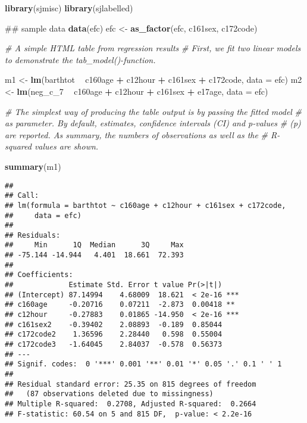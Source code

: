 \documentclass[]{article}
\newenvironment{Shaded}{\begin{snugshade}}{\end{snugshade}}
\newcommand{\KeywordTok}[1]{\textcolor[rgb]{0.13,0.29,0.53}{\textbf{#1}}}
\newcommand{\DataTypeTok}[1]{\textcolor[rgb]{0.13,0.29,0.53}{#1}}
\newcommand{\DecValTok}[1]{\textcolor[rgb]{0.00,0.00,0.81}{#1}}
\newcommand{\StringTok}[1]{\textcolor[rgb]{0.31,0.60,0.02}{#1}}
\newcommand{\CommentTok}[1]{\textcolor[rgb]{0.56,0.35,0.01}{\textit{#1}}}
\newcommand{\OperatorTok}[1]{\textcolor[rgb]{0.81,0.36,0.00}{\textbf{#1}}}
\newcommand{\NormalTok}[1]{#1}
\begin{document}
\begin{Shaded}
\begin{Highlighting}[]
\KeywordTok{library}\NormalTok{(sjmisc)}
\KeywordTok{library}\NormalTok{(sjlabelled)}

\NormalTok{## sample data}
\KeywordTok{data}\NormalTok{(efc)}
\NormalTok{efc <-}\StringTok{ }\KeywordTok{as_factor}\NormalTok{(efc, c161sex, c172code)}

\CommentTok{# A simple HTML table from regression results}
\CommentTok{# First, we fit two linear models to demonstrate the tab_model()-function.}
 
\NormalTok{m1 <-}\StringTok{ }\KeywordTok{lm}\NormalTok{(barthtot }\OperatorTok{~}\StringTok{ }\NormalTok{c160age }\OperatorTok{+}\StringTok{ }\NormalTok{c12hour }\OperatorTok{+}\StringTok{ }\NormalTok{c161sex }\OperatorTok{+}\StringTok{ }\NormalTok{c172code, }\DataTypeTok{data =}\NormalTok{ efc)}
\NormalTok{m2 <-}\StringTok{ }\KeywordTok{lm}\NormalTok{(neg_c_}\DecValTok{7} \OperatorTok{~}\StringTok{ }\NormalTok{c160age }\OperatorTok{+}\StringTok{ }\NormalTok{c12hour }\OperatorTok{+}\StringTok{ }\NormalTok{c161sex }\OperatorTok{+}\StringTok{ }\NormalTok{e17age, }\DataTypeTok{data =}\NormalTok{ efc)}

\CommentTok{# The simplest way of producing the table output is by passing the fitted model}
\CommentTok{# as parameter. By default, estimates, confidence intervals (CI) and p-values }
\CommentTok{# (p) are reported. As summary, the numbers of observations as well as the }
\CommentTok{# R-squared values are shown.}

\KeywordTok{summary}\NormalTok{(m1)}
\end{Highlighting}
\end{Shaded}

\begin{verbatim}
## 
## Call:
## lm(formula = barthtot ~ c160age + c12hour + c161sex + c172code, 
##     data = efc)
## 
## Residuals:
##     Min      1Q  Median      3Q     Max 
## -75.144 -14.944   4.401  18.661  72.393 
## 
## Coefficients:
##             Estimate Std. Error t value Pr(>|t|)    
## (Intercept) 87.14994    4.68009  18.621  < 2e-16 ***
## c160age     -0.20716    0.07211  -2.873  0.00418 ** 
## c12hour     -0.27883    0.01865 -14.950  < 2e-16 ***
## c161sex2    -0.39402    2.08893  -0.189  0.85044    
## c172code2    1.36596    2.28440   0.598  0.55004    
## c172code3   -1.64045    2.84037  -0.578  0.56373    
## ---
## Signif. codes:  0 '***' 0.001 '**' 0.01 '*' 0.05 '.' 0.1 ' ' 1
## 
## Residual standard error: 25.35 on 815 degrees of freedom
##   (87 observations deleted due to missingness)
## Multiple R-squared:  0.2708, Adjusted R-squared:  0.2664 
## F-statistic: 60.54 on 5 and 815 DF,  p-value: < 2.2e-16
\end{verbatim}
\end{document}

